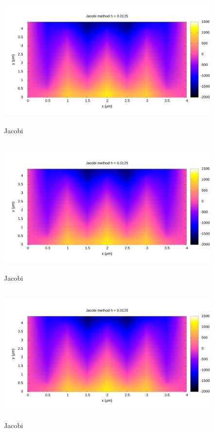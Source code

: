 \begin{figure}[ht]
    \centering
    \includegraphics[height= 70mm]{content/graphs/Jacobi_0125_map.png}
    \caption{Jacobi}
    \label{fig1}
\end{figure}%

\begin{figure}[ht]
    \centering
    \includegraphics[height= 70mm]{content/graphs/Jacobi_0125_map.png}
    \caption{Jacobi}
    \label{fig2:}
\end{figure}%
\begin{figure}[h]
    \centering
    \includegraphics[height= 70mm]{content/graphs/Jacobi_0125_map.png}
    \caption{Jacobi}
    \label{fig3:}
\end{figure}%

